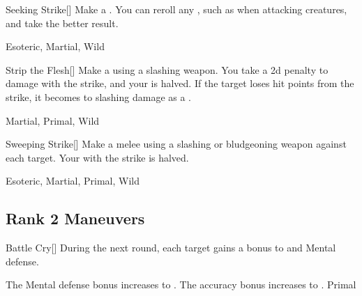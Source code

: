 \lowercase{\hypertarget{maneuver:Seeking Strike}{}}\label{maneuver:Seeking Strike}
\hypertarget{maneuver:Seeking Strike}{}
\begin{freeability}[Rank 1]{Seeking Strike}[]
Make a .
You can reroll any , such as when attacking  creatures, and take the better result.


 Esoteric, Martial, Wild
\end{freeability}
\vspace{0.25em}



\lowercase{\hypertarget{maneuver:Strip the Flesh}{}}\label{maneuver:Strip the Flesh}
\hypertarget{maneuver:Strip the Flesh}{}
\begin{freeability}[Rank 1]{Strip the Flesh}[]
Make a  using a slashing weapon.
You take a \minus2d penalty to damage with the strike, and your  is halved.
If the target loses hit points from the strike, it becomes  to slashing damage as a .


 Martial, Primal, Wild
\end{freeability}
\vspace{0.25em}



\lowercase{\hypertarget{maneuver:Sweeping Strike}{}}\label{maneuver:Sweeping Strike}
\hypertarget{maneuver:Sweeping Strike}{}
\begin{freeability}[Rank 1]{Sweeping Strike}[]
Make a melee  using a slashing or bludgeoning weapon against each target.
Your  with the strike is halved.


 Esoteric, Martial, Primal, Wild
\end{freeability}
\vspace{0.25em}


\subsection{Rank 2 Maneuvers}

\lowercase{\hypertarget{maneuver:Battle Cry}{}}\label{maneuver:Battle Cry}
\hypertarget{maneuver:Battle Cry}{}
\begin{freeability}[Rank 2]{Battle Cry}[]
During the next round, each target gains a  bonus to  and Mental defense.

\rankline
{} The Mental defense bonus increases to .
 The accuracy bonus increases to .
 Primal
\end{freeability}
\vspace{0.25em}



